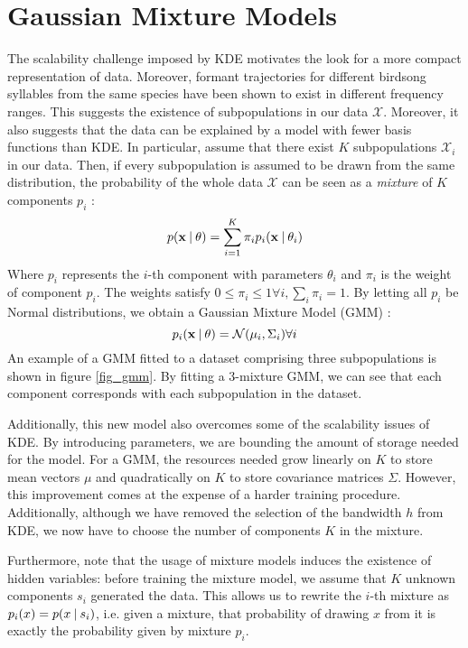 \documentclass[../main.tex]{subfiles}
\begin{document}
\section{Gaussian Mixture Models}\label{subsection_gmm}
The scalability challenge imposed by KDE motivates the look for a more compact representation of data. Moreover, formant trajectories for different birdsong syllables from the same species have been shown to exist in different frequency ranges. This suggests the existence of subpopulations in our data $\mathcal{X}$. Moreover, it also suggests that the data can be explained by a model with fewer basis functions than KDE. In particular, assume that there exist $K$ subpopulations $\mathcal{X}_i$ in our data. Then, if every subpopulation is assumed to be drawn from the same distribution, the probability of the whole data $\mathcal{X}$ can be seen as a \emph{mixture} of $K$ components $p_i$ \cite{Murphy2012}:
\begin{equation} \label{eq:mixmod}
p(\mathbf{x} \:\vert\: \theta ) = \sum_{i=1}^K\pi_i p_i(\mathbf{x} \:\vert\: \theta_i)
\end{equation}
Where $p_i$ represents the $i$-th component with parameters $\theta_i$ and $\pi_i$ is the weight of component $p_i$. The weights satisfy $0 \leq \pi_i \leq 1 \forall i, \sum_i \pi_i = 1$. By letting all $p_i$ be Normal distributions, we obtain a Gaussian Mixture Model (GMM) \cite{Bishop2006}:
\begin{equation*} \label{eq:gmm}
p_i(\mathbf{x} \:\vert\: \theta) = \mathcal{N}(\mathbf{\mu}_i, \Sigma_i) \forall i
\end{equation*}
An example of a GMM fitted to a dataset comprising three subpopulations is shown in figure \ref{fig_gmm}. By fitting a 3-mixture GMM, we can see that each component corresponds with each subpopulation in the dataset.
\par Additionally, this new model also overcomes some of the scalability issues of KDE. By introducing parameters, we are bounding the amount of storage needed for the model. For a GMM, the resources needed grow linearly on $K$ to store mean vectors $\mu$ and quadratically on $K$ to store covariance matrices $\Sigma$. However, this improvement comes at the expense of a harder training procedure. Additionally, although we have removed the selection of the bandwidth $h$ from KDE, we now have to choose the number of components $K$ in the mixture.
\par Furthermore, note that the usage of mixture models induces the existence of hidden variables: before training the mixture model, we assume that $K$ unknown components $s_i$ generated the data. This allows us to rewrite the $i$-th mixture as $p_i(x) = p(x \:\vert\: s_i)$, i.e. given a mixture, that probability of drawing $x$ from it is exactly the probability given by mixture $p_i$. 
\end{document}
